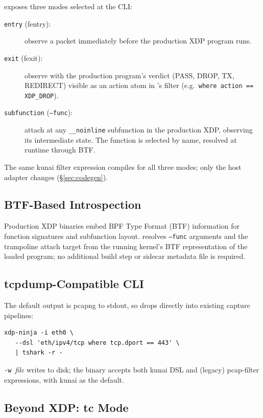 \xdpninja exposes three modes selected at the CLI:
\begin{description}
\item[\texttt{entry} (fentry):] observe a packet immediately before
the production XDP program runs.
\item[\texttt{exit} (fexit):] observe with the production program's
verdict (PASS, DROP, TX, REDIRECT) visible as an action atom in
\kunai's filter (e.g.\ \texttt{where action == XDP\_DROP}).
\item[\texttt{subfunction} (\texttt{--func}):] attach at any
\texttt{\_\_noinline} subfunction in the production XDP, observing
its intermediate state. The function is selected by name, resolved
at runtime through BTF.
\end{description}
The same kunai filter expression compiles for all three modes; only
the host adapter changes (\S\ref{sec:codegen}).

\subsection{BTF-Based Introspection}
\label{sec:btf-introspection}

Production XDP binaries embed BPF Type Format (BTF) information for
function signatures and subfunction layout. \xdpninja resolves
\texttt{--func} arguments and the trampoline attach target from the
running kernel's BTF representation of the loaded program; no
additional build step or sidecar metadata file is required.

\subsection{tcpdump-Compatible CLI}
\label{sec:cli}

The default output is pcapng to stdout, so \xdpninja drops directly
into existing capture pipelines:
\begin{lstlisting}[style=kunai,basicstyle=\footnotesize\ttfamily]
xdp-ninja -i eth0 \
   --dsl 'eth/ipv4/tcp where tcp.dport == 443' \
   | tshark -r -
\end{lstlisting}
\texttt{-w}~\textit{file} writes to disk; the binary accepts both kunai
DSL and (legacy) pcap-filter expressions, with kunai as the default.

\subsection{Beyond XDP: tc Mode}
\label{sec:tc-mode}

